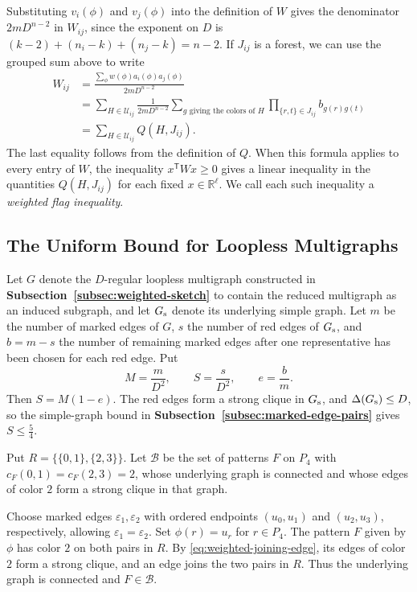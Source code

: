 \documentclass[preprint,11pt,numbers]{elsarticle-arxiv}
\numberwithin{equation}{section}
\theoremstyle{definition}
\begin{document}
Substituting $v_i(\phi)$ and $v_j(\phi)$ into the definition of $W$
gives the denominator $2mD^{n-2}$ in $W_{ij}$, since the exponent
on $D$ is $(k-2)+(n_i-k)+(n_j-k)=n-2$.
If $J_{ij}$ is a forest, we can use the grouped sum above to write
\[
\begin{aligned}
 W_{ij}
 &=\frac{\displaystyle\sum_\phi w(\phi)a_i(\phi)a_j(\phi)}
         {2mD^{n-2}}\\
 &=\sum_{H\in\mathcal U_{ij}}\frac{1}{2mD^{n-2}}
  \sum_{g\text{ giving the colors of }H}
  \prod_{\{r,t\}\in J_{ij}} b_{g(r)g(t)}\\
 &=\sum_{H\in\mathcal U_{ij}} Q(H,J_{ij}).
\end{aligned}
\]
The last equality follows from the definition of $Q$.
When this formula applies to every entry of $W$, the inequality
$x^{\mathsf T}Wx\geq0$ gives a linear inequality in the quantities
$Q(H,J_{ij})$ for each fixed $x\in\mathbb R^\ell$. We call each
such inequality a \emph{weighted flag inequality}.

\subsection{The Uniform Bound for Loopless Multigraphs}
\label{subsec:weighted-uniform-sketch}

Let $G$ denote the $D$-regular loopless multigraph constructed in
\textbf{Subsection~\ref{subsec:weighted-sketch}} to contain the
reduced multigraph as an induced subgraph, and let $G_{\rm s}$
denote its underlying simple graph. Let $m$ be the number of marked
edges of $G$, $s$ the number of red edges of $G_{\rm s}$, and
$b=m-s$ the number of remaining marked edges after one
representative has been chosen for each red edge. Put
\[
 M=\frac{m}{D^2},\qquad S=\frac{s}{D^2},\qquad e=\frac{b}{m}.
\]
Then $S=M(1-e)$. The red edges form a strong clique in $G_{\rm s}$,
and $\Delta(G_{\rm s})\leq D$, so the simple-graph bound in
\textbf{Subsection~\ref{subsec:marked-edge-pairs}} gives
$S\leq\frac{5}{4}$.

Put $R=\{\{0,1\},\{2,3\}\}$. Let $\mathcal B$ be the set of patterns
$F$ on $P_4$ with $c_F(0,1)=c_F(2,3)=2$, whose underlying graph is
connected and whose edges of color $2$ form a strong clique in that
graph.

Choose marked edges $\varepsilon_1,\varepsilon_2$ with ordered
endpoints $(u_0,u_1)$ and $(u_2,u_3)$, respectively, allowing
$\varepsilon_1=\varepsilon_2$. Set $\phi(r)=u_r$ for $r\in P_4$.
The pattern $F$ given by $\phi$ has color $2$ on both pairs in $R$.
By \eqref{eq:weighted-joining-edge}, its edges of color $2$ form a
strong clique, and an edge joins the two pairs in $R$. Thus the
underlying graph is connected and $F\in\mathcal B$.
\end{document}
